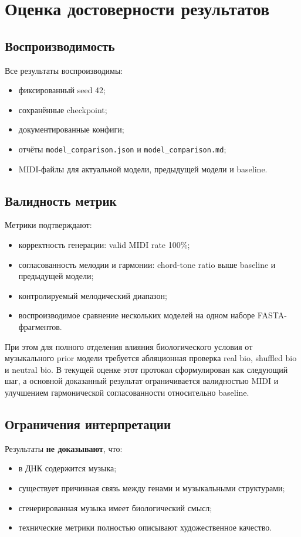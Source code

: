 \section{Оценка достоверности результатов}

\subsection{Воспроизводимость}

Все результаты воспроизводимы:
\begin{itemize}
\item фиксированный seed 42;
\item сохранённые checkpoint;
\item документированные конфиги;
\item отчёты \texttt{model\_comparison.json} и \texttt{model\_comparison.md};
\item MIDI-файлы для актуальной модели, предыдущей модели и baseline.
\end{itemize}

\subsection{Валидность метрик}

Метрики подтверждают:
\begin{itemize}
\item корректность генерации: valid MIDI rate 100\%;
\item согласованность мелодии и гармонии: chord-tone ratio выше baseline и предыдущей модели;
\item контролируемый мелодический диапазон;
\item воспроизводимое сравнение нескольких моделей на одном наборе FASTA-фрагментов.
\end{itemize}

При этом для полного отделения влияния биологического условия от музыкального prior модели требуется абляционная проверка real bio, shuffled bio и neutral bio. В текущей оценке этот протокол сформулирован как следующий шаг, а основной доказанный результат ограничивается валидностью MIDI и улучшением гармонической согласованности относительно baseline.

\subsection{Ограничения интерпретации}

Результаты \textbf{не доказывают}, что:
\begin{itemize}
\item в ДНК содержится музыка;
\item существует причинная связь между генами и музыкальными структурами;
\item сгенерированная музыка имеет биологический смысл;
\item технические метрики полностью описывают художественное качество.
\end{itemize}

